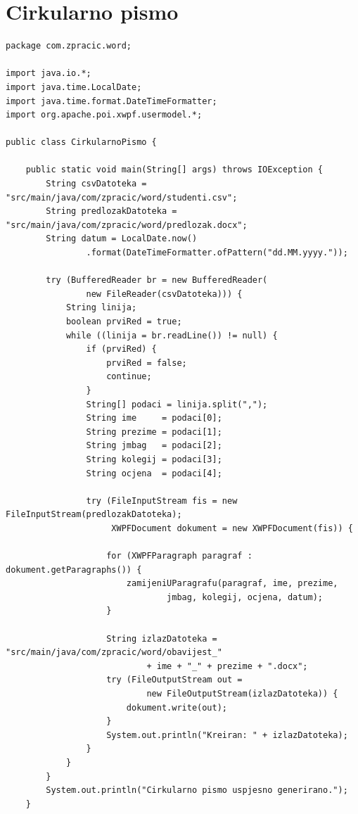 \documentclass[]{foi}
\begin{document}
\section*{Cirkularno pismo}
\label{cirkularno-pismo}

\begin{lstlisting}[style=Java, caption=Cirkularno pismo]
package com.zpracic.word;

import java.io.*;
import java.time.LocalDate;
import java.time.format.DateTimeFormatter;
import org.apache.poi.xwpf.usermodel.*;

public class CirkularnoPismo {

    public static void main(String[] args) throws IOException {
        String csvDatoteka = "src/main/java/com/zpracic/word/studenti.csv";
        String predlozakDatoteka = "src/main/java/com/zpracic/word/predlozak.docx";
        String datum = LocalDate.now()
                .format(DateTimeFormatter.ofPattern("dd.MM.yyyy."));

        try (BufferedReader br = new BufferedReader(
                new FileReader(csvDatoteka))) {
            String linija;
            boolean prviRed = true;
            while ((linija = br.readLine()) != null) {
                if (prviRed) {
                    prviRed = false;
                    continue;
                }
                String[] podaci = linija.split(",");
                String ime     = podaci[0];
                String prezime = podaci[1];
                String jmbag   = podaci[2];
                String kolegij = podaci[3];
                String ocjena  = podaci[4];

                try (FileInputStream fis = new FileInputStream(predlozakDatoteka);
                     XWPFDocument dokument = new XWPFDocument(fis)) {

                    for (XWPFParagraph paragraf : dokument.getParagraphs()) {
                        zamijeniUParagrafu(paragraf, ime, prezime, 
                                jmbag, kolegij, ocjena, datum);
                    }

                    String izlazDatoteka = "src/main/java/com/zpracic/word/obavijest_"
                            + ime + "_" + prezime + ".docx";
                    try (FileOutputStream out =
                            new FileOutputStream(izlazDatoteka)) {
                        dokument.write(out);
                    }
                    System.out.println("Kreiran: " + izlazDatoteka);
                }
            }
        }
        System.out.println("Cirkularno pismo uspjesno generirano.");
    }


\end{lstlisting}
\end{document}
